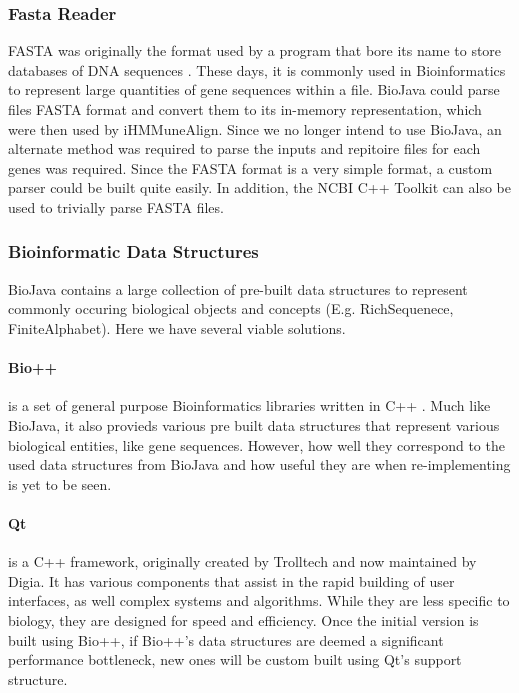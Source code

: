 \documentclass[a4paper,12pt]{report}
\begin{document}
\subsubsection{Fasta Reader}
FASTA was originally the format used by a program that bore its name to store databases of DNA sequences \autocite{fasta}. These days, it is commonly used in Bioinformatics to represent large quantities of gene sequences within a file. BioJava could parse files FASTA format and convert them to its in-memory representation, which were then used by iHMMuneAlign. Since we no longer intend to use BioJava, an alternate method was required to parse the inputs and repitoire files for each genes was required. Since the FASTA format is a very simple format, a custom parser could be built quite easily. In addition, the NCBI C++ Toolkit \autocite{ncbi-fasta} can also be used to trivially parse FASTA files.

\subsubsection{Bioinformatic Data Structures}
BioJava contains a large collection of pre-built data structures to represent commonly occuring biological objects and concepts (E.g. RichSequenece, FiniteAlphabet). Here we have several viable solutions.

\paragraph{Bio++}
is a set of general purpose Bioinformatics libraries written in C++ \autocite{bpp}. Much like BioJava, it also provieds various pre built data structures that represent various biological entities, like gene sequences. However, how well they correspond to the used data structures from BioJava and how useful they are when re-implementing is yet to be seen.

\paragraph{Qt}
is a C++ framework, originally created by Trolltech and now maintained by Digia. It has various components that assist in the rapid building of user interfaces, as well complex systems and algorithms. While they are less specific to biology, they are designed for speed and efficiency. Once the initial version is built using Bio++, if Bio++'s data structures are deemed a significant performance bottleneck, new ones will be custom built using Qt's support structure.
\end{document}
